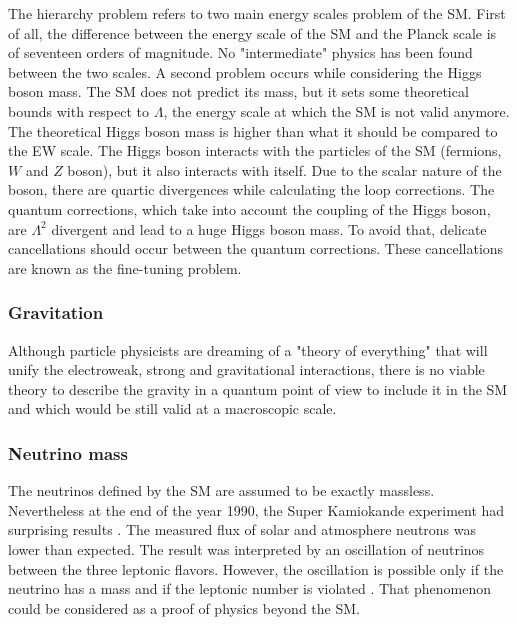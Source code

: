       The hierarchy problem refers to two main energy scales problem of the \gls{SM}.
      First of all, the difference between the energy scale of the \gls{SM} and the Planck scale is of seventeen orders of magnitude.
      No "intermediate" physics has been found between the two scales.
      A second problem occurs while considering the Higgs boson mass.
      The \gls{SM} does not predict its mass, but it sets some theoretical bounds with respect to $\Lambda$, the energy scale at which the \gls{SM} is not valid anymore.
      The theoretical Higgs boson mass is higher than what it should be compared to the EW scale.
      The Higgs boson interacts with the particles of the \gls{SM} (fermions, $W$ and $Z$ boson), but it also interacts with itself.
      Due to the scalar nature of the boson, there are quartic divergences while calculating the loop corrections.
      The quantum corrections, which take into account the coupling of the Higgs boson, are $\Lambda^2$ divergent and lead to a huge Higgs boson mass.
      To avoid that, delicate cancellations should occur between the quantum corrections.
      These cancellations are known as the fine-tuning problem. 
      
      \subsubsection{Gravitation}

      Although particle physicists are dreaming of a "theory of everything" that will unify the electroweak, strong and gravitational interactions, there is no viable theory to describe the gravity in a quantum point of view to include it in the \gls{SM} and which would be still valid at a macroscopic scale.

      \subsubsection{Neutrino mass}

      The neutrinos defined by the \gls{SM} are assumed to be exactly massless.
      Nevertheless at the end of the year 1990, the Super Kamiokande experiment had surprising results \cite{Super-Kamiokande-Oscillation}.
      The measured flux of solar and atmosphere neutrons was lower than expected.
      The result was interpreted by an oscillation of neutrinos between the three leptonic flavors.
      However, the oscillation is possible only if the neutrino has a mass and if the leptonic number is violated \cite{Dib}.
      That phenomenon could be considered as a proof of physics beyond the \gls{SM}.

